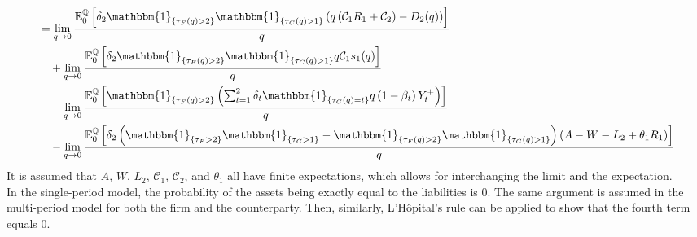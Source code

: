 \documentclass[main.tex]{subfiles}
\begin{document}
        \begin{align}
            &=
            \lim_{q \rightarrow 0}
            \frac{
                \mathbb{E}_{0}^{\rnmeasure}\left[
                    \delta_{2} \mathbbm{1}_{\{\tau_{F}(q)>2\}} \mathbbm{1}_{\{\tau_{C}(q)>1\}}
                    \left(
                        q\left(\mathcal{C}_{1} R_{1} + \mathcal{C}_{2}\right)
                        - D_{2}(q)
                    \right)
                \right]
            }{
                q
            }
            \nonumber
            \\
            &\quad+
            \lim_{q \rightarrow 0}
            \frac{
                \mathbb{E}_{0}^{\rnmeasure}\left[
                    \delta_2 \mathbbm{1}_{\{\tau_{F}(q)>2\}} \mathbbm{1}_{\{\tau_{C}(q)>1\}}
                    q\mathcal{C}_{1} s_1(q)
                \right]
            }{
                q
            }
            \nonumber
            \\
            &\quad-
            \lim_{q \rightarrow 0}
            \frac{
                \mathbb{E}_{0}^{\rnmeasure}\left[
                    \mathbbm{1}_{\{\tau_{F}(q)>2\}}
                    \left(
                        \sum_{t=1}^{2} \delta_{t} \mathbbm{1}_{\{\tau_{C}(q)=t\}}q\left(1-\beta_t\right)Y_{t}^{+}
                    \right)
                \right]
            }{
                q
            }
            \nonumber
            \\
            &\quad-
            \lim_{q \rightarrow 0}
            \frac{
                \mathbb{E}_{0}^{\rnmeasure}\left[
                    \delta_{2} \left(
                    \mathbbm{1}_{\{\tau_{F}>2\}} \mathbbm{1}_{\{\tau_{C}>1\}} - \mathbbm{1}_{\{\tau_{F}(q)>2\}} \mathbbm{1}_{\{\tau_{C}(q)>1\}}\right)
                    \left(
                        A - W
                        - L_{2}
                        + \theta_{1}R_{1}
                    \right)
                \right]
            }{
                q
            }
            \label{eqn:G-debt-multi-step-1}
        \end{align}
        It is assumed that $A$, $W$, $L_{2}$, $\mathcal{C}_1$, $\mathcal{C}_2$, and $\theta_1$ all have finite expectations,
        which allows for interchanging the limit and the expectation.
        \\
        In the single-period model, the probability of the assets being exactly equal to the liabilities is 0.
        The same argument is assumed in the multi-period model for both the firm and the counterparty.
        Then, similarly, 
        L'H\^{o}pital's %
        rule can be applied to show that the fourth term equals 0.
        
\end{document}
